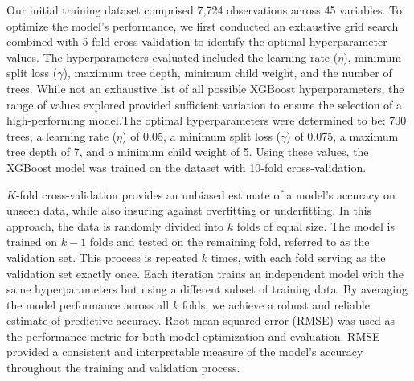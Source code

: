 \documentclass[
]{agujournal2019}
\begin{document}
Our initial training dataset comprised 7,724 observations across 45
variables. To optimize the model's performance, we first conducted an
exhaustive grid search combined with 5-fold cross-validation to identify
the optimal hyperparameter values. The hyperparameters evaluated
included the learning rate (\(\eta\)), minimum split loss (\(\gamma\)),
maximum tree depth, minimum child weight, and the number of trees. While
not an exhaustive list of all possible XGBoost hyperparameters, the
range of values explored provided sufficient variation to ensure the
selection of a high-performing model.The optimal hyperparameters were
determined to be: 700 trees, a learning rate (\(\eta\)) of 0.05, a
minimum split loss (\(\gamma\)) of 0.075, a maximum tree depth of 7, and
a minimum child weight of 5. Using these values, the XGBoost model was
trained on the dataset with 10-fold cross-validation.

\(K\)-fold cross-validation provides an unbiased estimate of a model's
accuracy on unseen data, while also insuring against overfitting or
underfitting. In this approach, the data is randomly divided into \(k\)
folds of equal size. The model is trained on \(k-1\) folds and tested on
the remaining fold, referred to as the validation set. This process is
repeated \(k\) times, with each fold serving as the validation set
exactly once. Each iteration trains an independent model with the same
hyperparameters but using a different subset of training data. By
averaging the model performance across all \(k\) folds, we achieve a
robust and reliable estimate of predictive accuracy. Root mean squared
error (RMSE) was used as the performance metric for both model
optimization and evaluation. RMSE provided a consistent and
interpretable measure of the model's accuracy throughout the training
and validation process.
\end{document}

